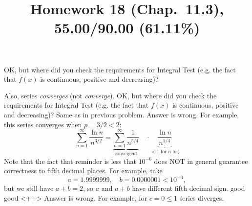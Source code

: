 \documentclass[10pt]{article} %
\title{Homework 18 (Chap.~11.3),
55.00/90.00 (61.11\%)
}
\begin{document}
\maketitle
OK, but where did you check the requirements for Integral Test (e.g. the fact that $f(x)$ is continuous, positive
and decreasing)?

Also, series \textit{converges} (not \textit{converge}).
OK, but where did you check the requirements for Integral Test (e.g. the fact that $f(x)$ is continuous, positive
and decreasing)?
Same as in previous problem.
Answer is wrong. For example, this series converges when $p=3/2<2$:
\begin{equation*}
	\sum_{n=1}^\infty \frac{\ln n}{n^{3/2}}=
	\underbrace{\sum_{n=1}^\infty \frac{1}{n^{5/4}}}_{\mbox{convergent}} 
	\quad\cdot\underbrace{\frac{\ln n}{n^{1/4}}}_{
		\mbox{$<1$ for $n$ big}}
\end{equation*}
Note that the fact that reminder is less that $10^{-6}$ does NOT in general guarantee correctness to fifth decimal
places. For example, take\begin{equation*}
	a=1.9999999,\quad b=0.0000001<10^{-6},
\end{equation*}
but we still have $a+b=2$, so $a$ and $a+b$ have different fifth decimal sign.
good
good
<++>
Answer is wrong. For example, for $c=0\le1$ series diverges.
\end{document}
